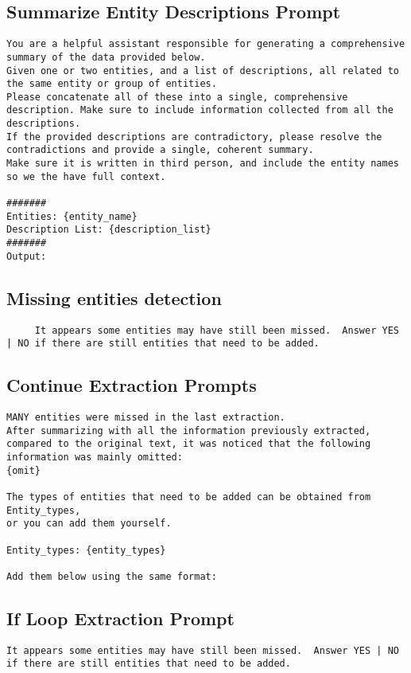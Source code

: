 \subsection{Summarize Entity Descriptions Prompt}\label{prompt:summarize-entity-descriptions}
\begin{lstlisting}
You are a helpful assistant responsible for generating a comprehensive summary of the data provided below.
Given one or two entities, and a list of descriptions, all related to the same entity or group of entities.
Please concatenate all of these into a single, comprehensive description. Make sure to include information collected from all the descriptions.
If the provided descriptions are contradictory, please resolve the contradictions and provide a single, coherent summary.
Make sure it is written in third person, and include the entity names so we the have full context.

#######
Entities: {entity_name}
Description List: {description_list}
#######
Output:
\end{lstlisting}

\subsection{Missing entities detection}\label{prompt:missing-entities}
\begin{lstlisting}
     It appears some entities may have still been missed.  Answer YES | NO if there are still entities that need to be added.
\end{lstlisting}

\subsection{Continue Extraction Prompts}\label{prompt:continue-extraction}
\begin{lstlisting}
MANY entities were missed in the last extraction.
After summarizing with all the information previously extracted, compared to the original text, it was noticed that the following information was mainly omitted:
{omit}

The types of entities that need to be added can be obtained from Entity_types,
or you can add them yourself.

Entity_types: {entity_types}

Add them below using the same format:
\end{lstlisting}

\subsection{If Loop Extraction Prompt}\label{prompt:if-loop-extraction}
\begin{lstlisting}
It appears some entities may have still been missed.  Answer YES | NO if there are still entities that need to be added.
\end{lstlisting}

